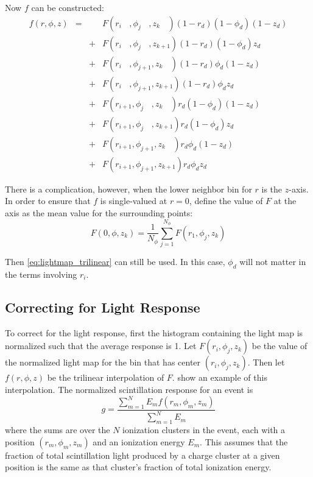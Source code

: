 \documentclass[herrin-thesis.tex]{subfiles}
\begin{document}
Now \(f\) can be constructed:
\begin{align}
f(r, \phi, z) &=&   & F(r_{i\phantom{+1}}, \phi_{j\phantom{+1}}, z_{k\phantom{+1}}) (1-r_d)(1-\phi_d)(1-z_d)	\nonumber\\
		& & + & F(r_{i\phantom{+1}}, \phi_{j\phantom{+1}}, z_{k+1})		     (1-r_d)(1-\phi_d)z_d 		\nonumber\\
		& & + & F(r_{i\phantom{+1}}, \phi_{j+1},		      z_{k\phantom{+1}}) (1-r_d)\phi_d(1-z_d)		\nonumber\\
		& & + & F(r_{i\phantom{+1}}, \phi_{j+1}, 		      z_{k+1})		     (1-r_d)\phi_d z_d			\nonumber\\
		& & + & F(r_{i+1}, 		     \phi_{j\phantom{+1}}, z_{k\phantom{+1}}) r_d(1-\phi_d)(1-z_d)		\nonumber\\
		& & + & F(r_{i+1}, 		     \phi_{j\phantom{+1}}, z_{k+1})		     r_d(1-\phi_d)z_d			\nonumber\\
		& & + & F(r_{i+1}, 		     \phi_{j+1}, 		      z_{k\phantom{+1}})  r_d\phi_d(1-z_d)			\nonumber\\
		& & + & F(r_{i+1},		     \phi_{j+1}, 		      z_{k+1})		      r_d\phi_dz_d
\label{eq:lightmap_trilinear}
\end{align}

There is a complication, however, when the lower neighbor bin for \(r\) is the \(z\)-axis. In order to ensure that \(f\) is single-valued at \(r=0\), define the value of \(F\) at the axis as the mean value for the surrounding points: 
\begin{equation}
F(0, \phi, z_k) = \frac{1}{N_\phi}\sum_{j=1}^{N_\phi} F(r_{1}, \phi_j, z_k)
\end{equation}

Then \cref{eq:lightmap_trilinear} can still be used. In this case, \(\phi_d\) will not matter in the terms involving \(r_i\).

\subsection{Correcting for Light Response}

To correct for the light response, first the histogram containing the light map is normalized such that the average response is 1. Let \(F(r_i, \phi_j, z_k)\) be the value of the normalized light map for the bin that has center \((r_i, \phi_j, z_k)\). Then let \(f(r,\phi,z)\) be the trilinear interpolation of \(F\).  show an example of this interpolation. The normalized scintillation response for an event is
\begin{equation}
g = \frac{\sum_{m=1}^{N}E_m f(r_m, \phi_m, z_m)}{\sum_{m=1}^{N}E_m}
\label{eq:lightmap_weighted_response}
\end{equation}
where the sums are over the \(N\) ionization clusters in the event, each with a position \((r_m, \phi_m, z_m)\) and an ionization energy \(E_m\). This assumes that the fraction of total scintillation light produced by a charge cluster at a given position is the same as that cluster's fraction of total ionization energy.
\end{document}
